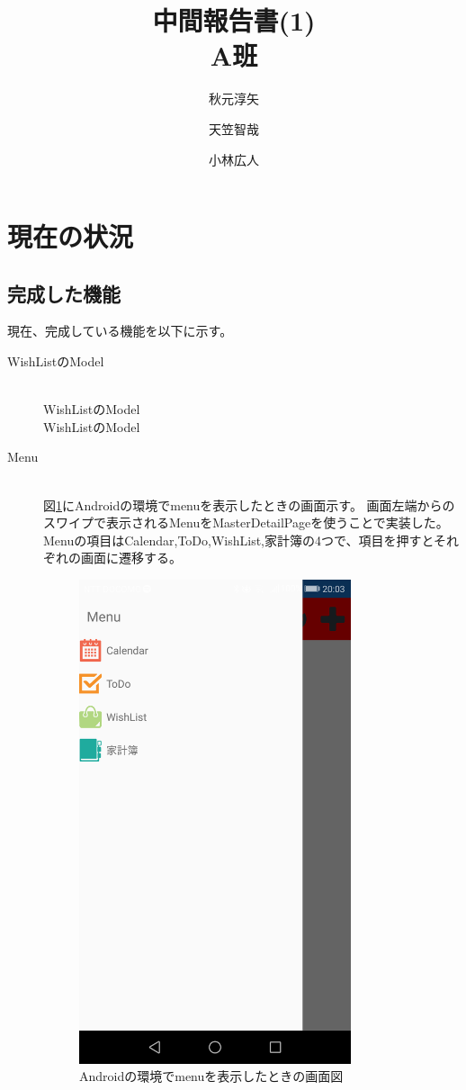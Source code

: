 ﻿\documentclass[a4j]{jarticle}
\title{中間報告書(1) \\ A班}
\author{秋元淳矢 \and 天笠智哉 \and 小林広人}
\date{}
\begin{document}
\maketitle

\section{現在の状況}
\subsection{完成した機能}
現在、完成している機能を以下に示す。
\begin{description}
	\item[WishListのModel] \mbox{} \\
		WishListのModel \\
		WishListのModel
	\item[Menu] \mbox{} \\
    	図\ref{MenuFig1}にAndroidの環境でmenuを表示したときの画面示す。
		画面左端からのスワイプで表示されるMenuをMasterDetailPageを使うことで実装した。
        Menuの項目はCalendar,ToDo,WishList,家計簿の4つで、項目を押すとそれぞれの画面に遷移する。
        
        \begin{figure}[h]
			\centering
 			\includegraphics[width=80mm]{figures/MenuPage.png} %
 			\caption{Androidの環境でmenuを表示したときの画面図}
 			\label{MenuFig1} %
		\end{figure}
\end{description}
\end{document}
